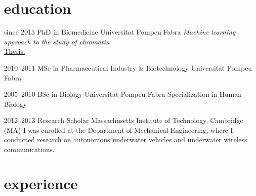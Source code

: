 \documentclass[]{friggeri-cv} %
\begin{document}
\section{education}

\begin{entrylist}

\entry
{since 2013}
{PhD {\normalfont in Biomedicine}}
{Universitat Pompeu Fabra}
{\emph{Machine learning approach to the study of chromatin}\\
\href{https://www.tdx.cat/handle/10803/565685}{{\FA \faExternalLink} Thesis.}}

\entry
{2010--2011}
{MSc {\normalfont in Pharmaceutical Industry \& Biotechnology}}
{Universitat Pompeu Fabra}
{}

\entry
{2005--2010}
{BSc {\normalfont in Biology}}
{Universitat Pompeu Fabra}
{Specialization in Human Biology}


\entry
{2012--2013}
{Research Scholar}
{Massachusetts Institute of Technology, Cambridge (MA)}
{I was enrolled at the Department of Mechanical Engineering,
  where I conducted research on autonomous underwater vehicles and
  underwater wireless communications.}

\end{entrylist}


\section{experience}
\end{document}
